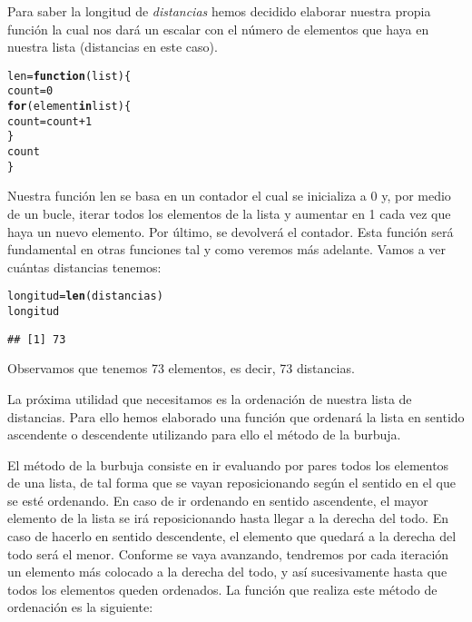 \documentclass[12pt]{report}\usepackage[]{graphicx}\usepackage[dvipsnames]{xcolor}
\makeatletter
\newcommand{\hlnum}[1]{\textcolor[rgb]{0.686,0.059,0.569}{#1}}%
\newcommand{\hlopt}[1]{\textcolor[rgb]{0,0,0}{#1}}%
\newcommand{\hlstd}[1]{\textcolor[rgb]{0.345,0.345,0.345}{#1}}%
\newcommand{\hlkwa}[1]{\textcolor[rgb]{0.161,0.373,0.58}{\textbf{#1}}}%
\newcommand{\hlkwb}[1]{\textcolor[rgb]{0.69,0.353,0.396}{#1}}%
\newcommand{\hlkwc}[1]{\textcolor[rgb]{0.333,0.667,0.333}{#1}}%
\newcommand{\hlkwd}[1]{\textcolor[rgb]{0.737,0.353,0.396}{\textbf{#1}}}%
\newenvironment{kframe}{%
 \def\at@end@of@kframe{}%
 \ifinner\ifhmode%
  \def\at@end@of@kframe{\end{minipage}}%
  \begin{minipage}{\columnwidth}%
 \fi\fi%
 \def\FrameCommand##1{\hskip\@totalleftmargin \hskip-\fboxsep
 \colorbox{shadecolor}{##1}\hskip-\fboxsep
     \hskip-\linewidth \hskip-\@totalleftmargin \hskip\columnwidth}%
 \MakeFramed {\advance\hsize-\width
   \@totalleftmargin\z@ \linewidth\hsize
   \@setminipage}}%
 {\par\unskip\endMakeFramed%
 \at@end@of@kframe}
\newenvironment{knitrout}{}{} %
\makeatother
\begin{document}
			Para saber la longitud de \textit{distancias} hemos decidido elaborar nuestra propia función la cual nos dará un escalar con el número de elementos que haya en nuestra lista (distancias en este caso). 
			
\begin{knitrout}
\color{fgcolor}\begin{kframe}
\begin{alltt}
\hlstd{len} \hlkwb{=} \hlkwa{function}\hlstd{(}\hlkwc{list}\hlstd{)\{}
        \hlstd{count} \hlkwb{=} \hlnum{0}
        \hlkwa{for} \hlstd{(element} \hlkwa{in} \hlstd{list)\{}
                \hlstd{count} \hlkwb{=} \hlstd{count} \hlopt{+} \hlnum{1}
        \hlstd{\}}
        \hlstd{count}
\hlstd{\}}
\end{alltt}
\end{kframe}
\end{knitrout}
			
			Nuestra función len se basa en un contador el cual se inicializa a 0 y, por medio de un bucle, iterar todos los elementos de la lista y aumentar en 1 cada vez que haya un nuevo elemento. Por último, se devolverá el contador. Esta función será fundamental en otras funciones tal y como veremos más adelante. Vamos a ver cuántas distancias tenemos:
			
\begin{knitrout}
\color{fgcolor}\begin{kframe}
\begin{alltt}
\hlstd{longitud} \hlkwb{=} \hlkwd{len}\hlstd{(distancias)}
\hlstd{longitud}
\end{alltt}
\begin{verbatim}
## [1] 73
\end{verbatim}
\end{kframe}
\end{knitrout}
			
			Observamos que tenemos 73 elementos, es decir, 73 distancias.
			
			La próxima utilidad que necesitamos es la ordenación de nuestra lista de distancias. Para ello hemos elaborado una función que ordenará la lista en sentido ascendente o descendente utilizando para ello el método de la burbuja. 
			
			El método de la burbuja consiste en ir evaluando por pares todos los elementos de una lista, de tal forma que se vayan reposicionando según el sentido en el que se esté ordenando. En caso de ir ordenando en sentido ascendente, el mayor elemento de la lista se irá reposicionando hasta llegar a la derecha del todo. En caso de hacerlo en sentido descendente, el elemento que quedará a la derecha del todo será el menor. Conforme se vaya avanzando, tendremos por cada iteración un elemento más colocado a la derecha del todo, y así sucesivamente hasta que todos los elementos queden ordenados. La función que realiza este método de ordenación es la siguiente:
			
\end{document}
